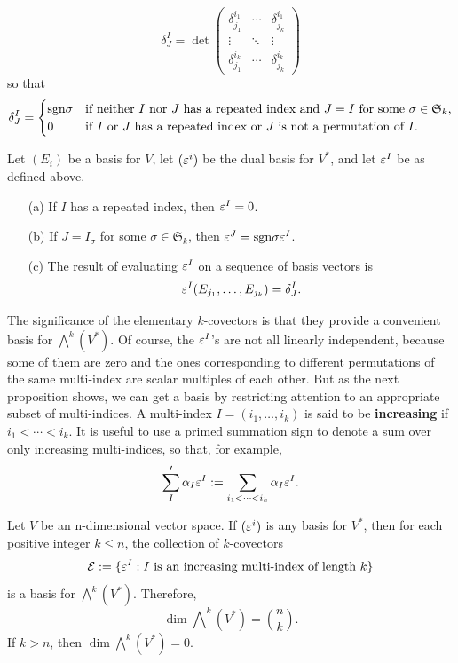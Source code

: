 \[\delta^I_J=\det\begin{pmatrix}
\delta^{i_1}_{j_1}&\cdots&\delta^{i_1}_{j_k}\\
\vdots&\ddots&\vdots\\
\delta^{i_k}_{j_1}&\cdots&\delta^{i_k}_{j_k}
\end{pmatrix}\]
so that
\[\delta^I_J=\begin{cases}
\mathrm{sgn}\sigma&\text{if neither $I$ nor $J$ has a repeated index and $J=I$ for some $\sigma\in\mathfrak{S}_k$,}\\
0&\text{if $I$ or $J$ has a repeated index or $J$ is not a permutation of $I$.}
\end{cases}\]
\begin{lemma}\label{alt elementry prop}\label{alt ele prop}
Let $(E_i)$ be a basis for $V$, let $(\varepsilon^i)$ be the dual basis for $V^*$, and let $\varepsilon^I$ be as defined above.
\begin{itemize}
\item[(a)] If $I$ has a repeated index, then $\varepsilon^I=0$.
\item[(b)] If $J=I_\sigma$ for some $\sigma\in\mathfrak{S}_k$, then $\varepsilon^J=\mathrm{sgn}\sigma\varepsilon^I$.
\item[(c)] The result of evaluating $\varepsilon^I$ on a sequence of basis vectors is
\[\varepsilon^I(E_{j_1},\dots,E_{j_k})=\delta^I_J.\]
\end{itemize}
\end{lemma}
The significance of the elementary $k$-covectors is that they provide a convenient basis for $\bigwedge^k(V^*)$. Of course, the $\varepsilon^I$'s are not all linearly independent, because some of them are zero and the ones corresponding to different permutations of the same multi-index are scalar multiples of each other. But as the next proposition shows, we can get a basis by restricting attention to an appropriate subset of multi-indices. A multi-index $I=(i_1,\dots,i_k)$ is said to be \textbf{increasing} if $i_1<\cdots<i_k$. It is useful to use a primed summation sign to denote a sum over only increasing multi-indices, so that, for example,
\[\sum'_I\alpha_I\varepsilon^I:=\sum_{i_1<\cdots<i_k}\alpha_I\varepsilon^I.\]
\begin{proposition}\label{alt tensor basis}
Let $V$ be an n-dimensional vector space. If $(\varepsilon^i)$ is any basis for $V^*$, then for each positive integer $k\leq n$, the collection of $k$-covectors
\[\mathcal{E}:=\{\varepsilon^I:\text{$I$ is an increasing multi-index of length $k$}\}\]
is a basis for $\bigwedge^k(V^*)$. Therefore,
\[\dim\bigwedge\nolimits^k(V^*)=\binom{n}{k}.\]
If $k>n$, then $\dim\bigwedge^k(V^*)=0$.
\end{proposition}
